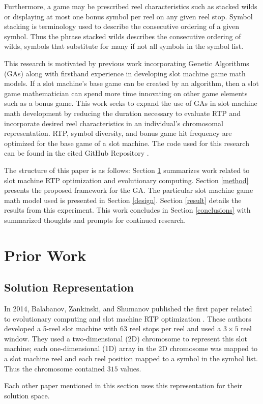 \documentclass[conference]{IEEEtran}
\begin{document}
\par
Furthermore, a game may be prescribed reel characteristics such as stacked wilds or displaying at most one bonus symbol per reel on any given reel stop.
Symbol stacking is terminology used to describe the consecutive ordering of a given symbol.
Thus the phrase stacked wilds describes the consecutive ordering of wilds, symbols that substitute for many if not all symbols in the symbol list.
\par
This research is motivated by previous work incorporating Genetic Algorithms (GAs) along with firsthand experience in developing slot machine game math models.
If a slot machine's base game can be created by an algorithm, then a slot game mathematician can spend more time innovating on other game elements such as a bonus game.
This work seeks to expand the use of GAs in slot machine math development by reducing the duration necessary to evaluate RTP and incorporate desired reel characteristics in an individual's chromosomal representation.
RTP, symbol diversity, and bonus game hit frequency are optimized for the base game of a slot machine.
The code used for this research can be found in the cited GitHub Repository \cite{ReelCharacteristicsRepo}.
\par
The structure of this paper is as follows: Section \ref{prior} summarizes work related to slot machine RTP optimization and evolutionary computing. Section \ref{method} presents the proposed framework for the GA. The particular slot machine game math model used is presented in Section \ref{design}. Section \ref{result} details the results from this experiment. This work concludes in Section \ref{conclusions} with summarized thoughts and prompts for continued research.
\section{Prior Work}
\label{prior}
\subsection{Solution Representation}
In 2014, Balabanov, Zankinski, and Shumanov published the first paper related to evolutionary computing and slot machine RTP optimization \cite{balabanov2015slot}.
These authors developed a 5-reel slot machine with 63 reel stops per reel and used a $3\times 5$ reel window.
They used a two-dimensional (2D) chromosome to represent this slot machine; each one-dimensional (1D) array in the 2D chromosome was mapped to a slot machine reel and each reel position mapped to a symbol in the symbol list. Thus the chromosome contained $315$ values.
\par
Each other paper mentioned in this section uses this representation for their solution space.
\end{document}
